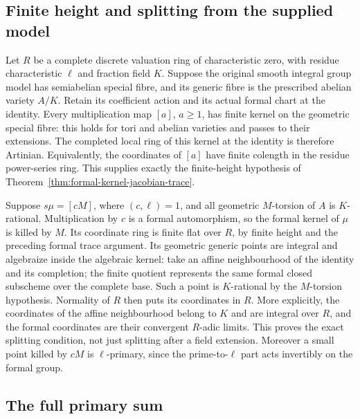 \subsection*{Finite height and splitting from the supplied model}

Let $R$ be a complete discrete valuation ring of characteristic zero,
with residue characteristic $\ell$ and fraction field $K$.  Suppose
the original smooth integral group model has semiabelian special fibre,
and its generic fibre is the prescribed abelian variety $A/K$.
Retain its coefficient action and its actual formal chart at the identity.
Every multiplication map $[a]$, $a\geq1$, has finite kernel on the
geometric special fibre: this holds for tori and abelian varieties and
passes to their extensions.  The completed local ring of this kernel
at the identity is therefore Artinian.  Equivalently, the coordinates
of $[a]$ have finite colength in the residue power-series ring.  This
supplies exactly the finite-height hypothesis of
Theorem~\ref{thm:formal-kernel-jacobian-trace}.

Suppose $s\mu=[cM]$, where $(c,\ell)=1$, and all geometric $M$-torsion
of $A$ is $K$-rational.  Multiplication by $c$ is a formal automorphism,
so the formal kernel of $\mu$ is killed by $M$.  Its coordinate ring is
finite flat over $R$, by finite height and the preceding formal trace
argument.  Its geometric generic points are integral and algebraize
inside the algebraic kernel: take an affine neighbourhood of the
identity and its completion; the finite quotient represents the same
formal closed subscheme over the complete base.  Such a point is
$K$-rational by the $M$-torsion hypothesis.  Normality of $R$ then puts
its coordinates in $R$.  More explicitly, the coordinates of the
affine neighbourhood belong to $K$ and are integral over $R$, and the
formal coordinates are their convergent $R$-adic limits.  This proves
the exact splitting condition, not just splitting after a field
extension.  Moreover a small point killed by $cM$ is $\ell$-primary,
since the prime-to-$\ell$ part acts invertibly on the formal group.

\subsection*{The full primary sum}


